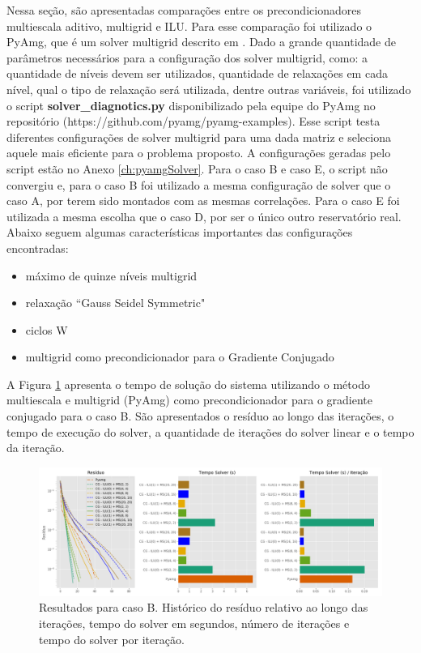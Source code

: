 Nessa seção, são apresentadas comparações entre os precondicionadores multiescala aditivo, multigrid e ILU. Para esse comparação foi utilizado o PyAmg, que é um solver multigrid  descrito em \citet{OlSc2018}. Dado a grande quantidade de parâmetros necessários para a configuração dos solver multigrid, como: a quantidade de níveis devem ser utilizados, quantidade de relaxações em cada nível, qual o tipo de relaxação será utilizada, dentre outras variáveis, foi utilizado o script \textbf{solver\_diagnotics.py} disponibilizado pela equipe do PyAmg no repositório (https://github.com/pyamg/pyamg-examples). Esse script testa diferentes configurações de solver multigrid para uma dada matriz e seleciona aquele mais eficiente para o problema proposto. A configurações geradas pelo script estão no Anexo \ref{ch:pyamgSolver}. Para o caso B e caso E, o script não convergiu e, para o caso B foi utilizado a mesma configuração de solver que o caso A, por terem sido montados com as mesmas correlações. Para o caso E foi utilizada a mesma escolha que o caso D, por ser o único outro reservatório real. Abaixo seguem algumas características importantes das configurações encontradas:

\begin{itemize}
    \item máximo de quinze níveis multigrid
    \item relaxação ``Gauss Seidel Symmetric" 
    \item ciclos W
    \item multigrid como precondicionador para o Gradiente Conjugado
\end{itemize}


A Figura \ref{fig:reservatorio320x320_1} apresenta o tempo de solução do sistema utilizando o método multiescala e multigrid (PyAmg) como precondicionador para o gradiente conjugado para o caso B. São apresentados o resíduo ao longo das iterações, o tempo de execução do solver, a quantidade de iterações do solver linear e o tempo da iteração.

\begin{figure}[!htbp]
\centering
\includegraphics[width=\textwidth]{chap08/figs/reservatorio320x320_1.png}
\caption{Resultados para caso B. Histórico do resíduo relativo ao longo das iterações, tempo do solver em segundos, número de iterações e tempo do solver por iteração. }
\label{fig:reservatorio320x320_1} 
\end{figure}

